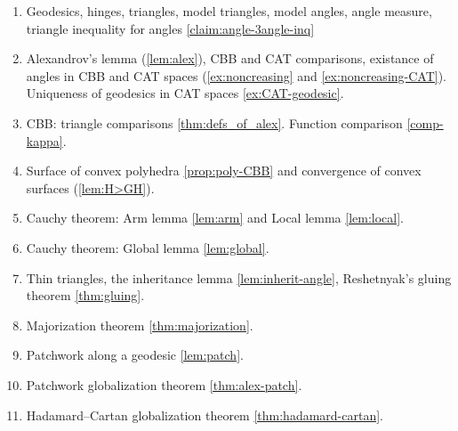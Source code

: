 \begin{enumerate}
\item Geodesics, hinges, triangles, model triangles, model angles, angle measure, triangle inequality for angles \ref{claim:angle-3angle-inq}
\item Alexandrov's lemma (\ref{lem:alex}), CBB and CAT comparisons,
existance of angles in CBB and CAT spaces (\ref{ex:noncreasing} and \ref{ex:noncreasing-CAT}).
Uniqueness of geodesics in CAT spaces \ref{ex:CAT-geodesic}.
\item CBB: triangle comparisons \ref{thm:defs_of_alex}. Function comparison \ref{comp-kappa}.
\item Surface of convex polyhedra \ref{prop:poly-CBB} and convergence of convex surfaces (\ref{lem:H>GH}).
\item Cauchy theorem: Arm lemma \ref{lem:arm} and Local lemma \ref{lem:local}.
\item Cauchy theorem: Global lemma \ref{lem:global}.
\item Thin triangles, the inheritance lemma \ref{lem:inherit-angle}, Reshetnyak's gluing theorem \ref{thm:gluing}.
\item Majorization theorem \ref{thm:majorization}.
\item Patchwork along a geodesic \ref{lem:patch}.
\item Patchwork globalization theorem \ref{thm:alex-patch}.
\item Hadamard--Cartan globalization theorem \ref{thm:hadamard-cartan}.

\end{enumerate}
